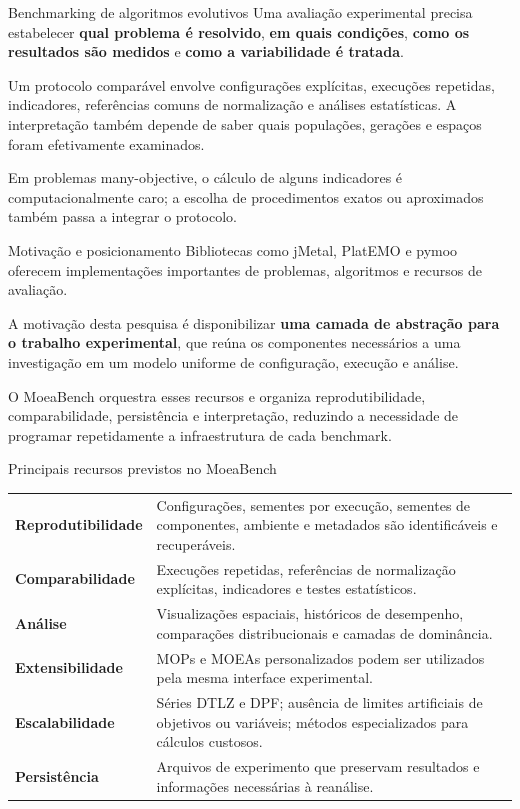 \begin{frame}{Benchmarking de algoritmos evolutivos}
Uma avaliação experimental precisa estabelecer \textbf{qual problema é resolvido}, \textbf{em quais condições}, \textbf{como os resultados são medidos} e \textbf{como a variabilidade é tratada}.
\par\medskip
Um protocolo comparável envolve configurações explícitas, execuções repetidas, indicadores, referências comuns de normalização e análises estatísticas. A interpretação também depende de saber quais populações, gerações e espaços foram efetivamente examinados.
\par\medskip
Em problemas many-objective, o cálculo de alguns indicadores é computacionalmente caro; a escolha de procedimentos exatos ou aproximados também passa a integrar o protocolo.
\end{frame}

\begin{frame}{Motivação e posicionamento}
Bibliotecas como jMetal, PlatEMO e pymoo oferecem implementações importantes de problemas, algoritmos e recursos de avaliação.
\par\medskip
A motivação desta pesquisa é disponibilizar \textbf{uma camada de abstração para o trabalho experimental}, que reúna os componentes necessários a uma investigação em um modelo uniforme de configuração, execução e análise.
\par\medskip
O MoeaBench orquestra esses recursos e organiza reprodutibilidade, comparabilidade, persistência e interpretação, reduzindo a necessidade de programar repetidamente a infraestrutura de cada benchmark.
\end{frame}

\begin{frame}{Principais recursos previstos no MoeaBench}
\begin{tabularx}{\linewidth}{@{}>{\bfseries}p{.27\linewidth}X@{}}
Reprodutibilidade & Configurações, sementes por execução, sementes de componentes, ambiente e metadados são identificáveis e recuperáveis.\\[5pt]
Comparabilidade & Execuções repetidas, referências de normalização explícitas, indicadores e testes estatísticos.\\[5pt]
Análise & Visualizações espaciais, históricos de desempenho, comparações distribucionais e camadas de dominância.\\[5pt]
Extensibilidade & MOPs e MOEAs personalizados podem ser utilizados pela mesma interface experimental.\\[5pt]
Escalabilidade & Séries DTLZ e DPF; ausência de limites artificiais de objetivos ou variáveis; métodos especializados para cálculos custosos.\\[5pt]
Persistência & Arquivos de experimento que preservam resultados e informações necessárias à reanálise.\\
\end{tabularx}
\vspace{.13cm}{\scriptsize Fontes: monografia, capítulo 4; MoeaBench User Guide.}
\end{frame}

